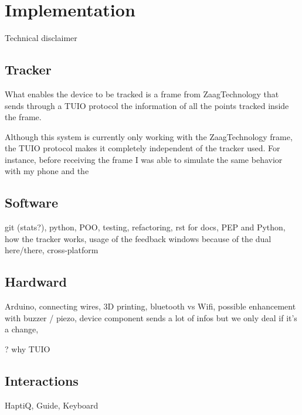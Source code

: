 \chapter{Implementation}

Technical disclaimer

\section{Tracker}\label{tracker}

What enables the device to be tracked is a frame from ZaagTechnology
that sends through a TUIO protocol the information of all the points
tracked inside the frame.

Although this system is currently only working with the ZaagTechnology
frame, the TUIO protocol makes it completely independent of the tracker
used. For instance, before receiving the frame I was able to simulate
the same behavior with my phone and the

\section{Software}\label{software}

git (stats?), python, POO, testing, refactoring, rst for docs, PEP and
Python, how the tracker works, usage of the feedback windows because of
the dual here/there, cross-platform

\section{Hardward}\label{hardward}

Arduino, connecting wires, 3D printing, bluetooth vs Wifi, possible
enhancement with buzzer / piezo, device component sends a lot of infos
but we only deal if it's a change,

? why TUIO

\section{Interactions}\label{interactions}

HaptiQ, Guide, Keyboard
